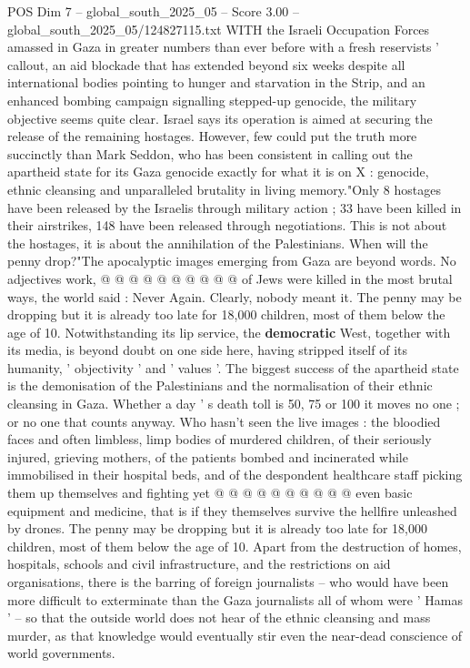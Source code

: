 \begin{textsample}{POS Dim 7 – global\_south\_2025\_05 – Score 3.00 – global\_south\_2025\_05/124827115.txt}  \label{ex:f7_pos_439}
WITH the Israeli Occupation Forces amassed in Gaza in greater numbers than ever before with a fresh reservists ' callout, an aid blockade that has extended beyond six weeks despite all international bodies pointing to hunger and starvation in the Strip, and an enhanced bombing campaign signalling stepped-up genocide, the military objective seems quite clear.
Israel says its operation is aimed at securing the release of the remaining hostages.
However, few could put the truth more succinctly than Mark Seddon, who has been consistent in calling out the apartheid state for its Gaza genocide exactly for what it is on X : genocide, ethnic cleansing and unparalleled brutality in living memory."Only 8 hostages have been released by the Israelis through military action ; 33 have been killed in their airstrikes, 148 have been released through negotiations.
This is not about the hostages, it is about the annihilation of the Palestinians.
When will the penny drop?"The apocalyptic images emerging from Gaza are beyond words.
No adjectives work, @ @ @ @ @ @ @ @ @ @ of Jews were killed in the most brutal ways, the world said : Never Again.
Clearly, nobody meant it.
The penny may be dropping but it is already too late for 18,000 children, most of them below the age of 10.
Notwithstanding its lip service, the \textbf{democratic} West, together with its media, is beyond doubt on one side here, having stripped itself of its humanity, ' objectivity ' and ' values '.
The biggest success of the apartheid state is the demonisation of the Palestinians and the normalisation of their ethnic cleansing in Gaza.
Whether a day ' s death toll is 50, 75 or 100 it moves no one ; or no one that counts anyway.
Who hasn't seen the live images : the bloodied faces and often limbless, limp bodies of murdered children, of their seriously injured, grieving mothers, of the patients bombed and incinerated while immobilised in their hospital beds, and of the despondent healthcare staff picking them up themselves and fighting yet @ @ @ @ @ @ @ @ @ @ even basic equipment and medicine, that is if they themselves survive the hellfire unleashed by drones.
The penny may be dropping but it is already too late for 18,000 children, most of them below the age of 10.
Apart from the destruction of homes, hospitals, schools and civil infrastructure, and the restrictions on aid organisations, there is the barring of foreign journalists -- who would have been more difficult to exterminate than the Gaza journalists all of whom were ' Hamas ' -- so that the outside world does not hear of the ethnic cleansing and mass murder, as that knowledge would eventually stir even the near-dead conscience of world governments.

\end{textsample}
